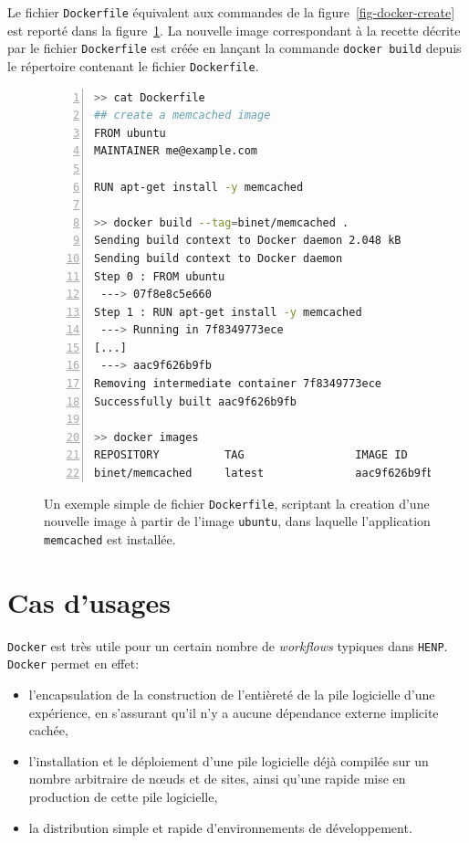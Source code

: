 \documentclass[a4paper]{article}
\begin{document}
Le fichier \texttt{Dockerfile} \'equivalent aux commandes de la
figure~\ref{fig-docker-create} est report\'e dans la
figure~\ref{fig-docker-dockerfile-create}.
La nouvelle image correspondant \`a la recette d\'ecrite par le fichier
\texttt{Dockerfile} est cr\'e\'ee en lan\c cant la commande
\texttt{docker~build} depuis le r\'epertoire contenant le fichier
\texttt{Dockerfile}.

\begin{figure}[h]
	\begin{lstlisting}[language=sh,
		basicstyle=\tiny,
		frame=trbl,
		numbers=left,
		showstringspaces=false,
	stringstyle=\ttfamily]
>> cat Dockerfile
## create a memcached image
FROM ubuntu
MAINTAINER me@example.com

RUN apt-get install -y memcached

>> docker build --tag=binet/memcached .
Sending build context to Docker daemon 2.048 kB
Sending build context to Docker daemon 
Step 0 : FROM ubuntu
 ---> 07f8e8c5e660
Step 1 : RUN apt-get install -y memcached
 ---> Running in 7f8349773ece
[...]
 ---> aac9f626b9fb
Removing intermediate container 7f8349773ece
Successfully built aac9f626b9fb

>> docker images
REPOSITORY          TAG                 IMAGE ID            CREATED              VIRTUAL SIZE
binet/memcached     latest              aac9f626b9fb        About a minute ago   190 MB
\end{lstlisting}
\caption{\label{fig-docker-dockerfile-create}Un exemple simple de fichier
	\texttt{Dockerfile}, scriptant la creation d'une nouvelle image \`a partir
	de l'image \texttt{ubuntu}, dans laquelle l'application \texttt{memcached}
est install\'ee.}
\end{figure}


\section*{Cas d'usages}

\texttt{Docker} est tr\`es utile pour un certain nombre de \emph{workflows}
typiques dans \texttt{HENP}.
\texttt{Docker} permet en effet:
\begin{itemize}
 \item l'encapsulation de la construction de l'enti\`eret\'e de la pile
	 logicielle d'une exp\'erience, en s'assurant qu'il n'y a aucune
	 d\'ependance externe implicite cach\'ee,
 \item l'installation et le d\'eploiement d'une pile logicielle d\'ej\`a
	 compil\'ee sur un nombre arbitraire de n\oe uds et de sites, ainsi qu'une
	 rapide mise en production de cette pile logicielle,
 \item la distribution simple et rapide d'environnements de d\'eveloppement.
\end{itemize}
\end{document}
